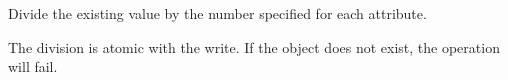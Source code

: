 Divide the existing value by the number specified for each attribute.

The division is atomic with the write.  If the object does not exist, the
operation will fail.




